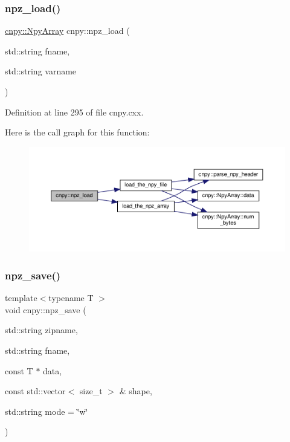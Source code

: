 \subsubsection{\texorpdfstring{npz\+\_\+load()}{npz\_load()}\hspace{0.1cm}{\footnotesize\ttfamily [2/2]}}
{\footnotesize\ttfamily \hyperlink{structcnpy_1_1_npy_array}{cnpy\+::\+Npy\+Array} cnpy\+::npz\+\_\+load (\begin{DoxyParamCaption}\item[{std\+::string}]{fname,  }\item[{std\+::string}]{varname }\end{DoxyParamCaption})}



Definition at line 295 of file cnpy.\+cxx.

Here is the call graph for this function\+:
\nopagebreak
\begin{figure}[H]
\begin{center}
\leavevmode
\includegraphics[width=350pt]{namespacecnpy_abfeb43960d51a799dbe718b3d73e8b52_cgraph}
\end{center}
\end{figure}
\mbox{\label{namespacecnpy_acdeed7370a9ddc23ce3b66534e039a1f}} 
\subsubsection{\texorpdfstring{npz\+\_\+save()}{npz\_save()}\hspace{0.1cm}{\footnotesize\ttfamily [1/2]}}
{\footnotesize\ttfamily template$<$typename T $>$ \\
void cnpy\+::npz\+\_\+save (\begin{DoxyParamCaption}\item[{std\+::string}]{zipname,  }\item[{std\+::string}]{fname,  }\item[{const T $\ast$}]{data,  }\item[{const std\+::vector$<$ size\+\_\+t $>$ \&}]{shape,  }\item[{std\+::string}]{mode = {\ttfamily \char`\"{}w\char`\"{}} }\end{DoxyParamCaption})}




